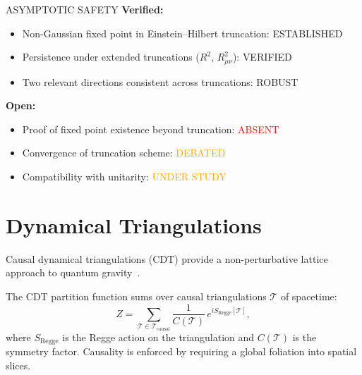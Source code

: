 \begin{factcheck}{ASYMPTOTIC SAFETY}
\textbf{Verified:}
\begin{itemize}
    \item Non-Gaussian fixed point in Einstein--Hilbert truncation:
          \textcolor{validcolor}{ESTABLISHED}~\cite{reuter1998nonperturbative}
    \item Persistence under extended truncations ($R^2$, $R_{\mu\nu}^2$):
          \textcolor{validcolor}{VERIFIED}
    \item Two relevant directions consistent across truncations:
          \textcolor{validcolor}{ROBUST}
\end{itemize}

\textbf{Open:}
\begin{itemize}
    \item Proof of fixed point existence beyond truncation:
          \textcolor{red}{ABSENT}
    \item Convergence of truncation scheme: \textcolor{orange}{DEBATED}
    \item Compatibility with unitarity: \textcolor{orange}{UNDER STUDY}
\end{itemize}
\end{factcheck}

\section{Dynamical Triangulations}
\label{sec:cdt}

Causal dynamical triangulations (CDT) provide a non-perturbative lattice
approach to quantum gravity~\cite{ambjorn2012nonperturbative}.

\begin{definition}
\label{def:cdt}
The CDT partition function sums over causal triangulations $\mathcal{T}$
of spacetime:
\begin{equation}
Z = \sum_{\mathcal{T} \in \mathcal{T}_{\mathrm{causal}}}
\frac{1}{C(\mathcal{T})}\, e^{i S_{\mathrm{Regge}}[\mathcal{T}]},
\end{equation}
where $S_{\mathrm{Regge}}$ is the Regge action on the triangulation and
$C(\mathcal{T})$ is the symmetry factor.  Causality is enforced by
requiring a global foliation into spatial slices.
\end{definition}

